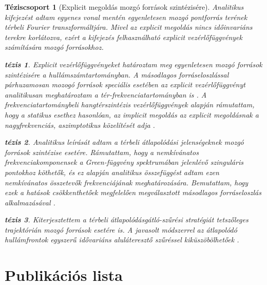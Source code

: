\documentclass[10pt,twoside]{article}
\theoremstyle{thesisgroupstyle}
\newtheorem{thesisgroup}{Téziscsoport}
\theoremstyle{indented}
\newtheorem{thesis}{tézis}[thesisgroup]
\begin{document}
\begin{thesisgroup}[Explicit megoldás mozgó források szintézisére]
Analitikus kifejezést adtam egyenes vonal mentén egyenletesen mozgó pontforrás terének térbeli Fourier transzformáltjára.
Mivel az explicit megoldás nincs időinvariáns terekre korlátozva, ezért a kifejezés felhasználható explicit vezérlőfüggvények számítására mozgó forrásokhoz.
\begin{thesis} 
Explicit vezérlőfüggvényeket határoztam meg egyenletesen mozgó források szintézisére a hullámszámtartományban.
A másodlagos forráseloszlással párhuzamosan mozogó források speciális esetében az explicit vezérlőfüggvényt analitikusan meghatároztam a tér-frekvenciatartományban is \cite{Firtha2014:daga_booklet, Firtha2014:isma_booklet, firtha2015sound_booklet}.
A frekvenciatartománybeli hangtérszintézis vezérlőfüggvények alapján rámutattam, hogy a statikus esethez hasonlóan, az implicit megoldás az explicit megoldásnak a nagyfrekvenciás, aszimptotikus közelítését adja \cite{firtha2015sound_booklet}. 
\end{thesis}
\begin{thesis}
Analitikus leírását adtam a térbeli átlapolódási jelenségeknek mozgó források szintézise esetére.
Rámutattam, hogy a nemkívánatos frekvenciakomponensek a Green-függvény spektrumában jelenlévő szinguláris pontokhoz köthetők, és ez alapján analitikus összefüggést adtam ezen nemkívánatos összetevők frekvenciájának meghatározására.
Bemutattam, hogy ezek a hatások csökkenthetőek megfelelően megválasztott másodlagos forráseloszlás alkalmazásával \cite{firtha2016:daga_booklet}.
\end{thesis}
\begin{thesis} 
Kiterjesztettem a térbeli átlapolódásgátló-szűrési stratégiát tetszőleges trajektórián mozgó források esetére is.
A javasolt módszerrel az átlapolódó hullámfrontok egyszerű idővariáns aluláteresztő szűréssel kiküszöbölhetőek \cite{Firtha2018_daga_moving_source_booklet}.
\end{thesis}
\end{thesisgroup} 
\clearpage

\section*{Publikációs lista}

\nocite{*}
\begin{refcontext}[labelprefix=J]
\printbibliography[title={Folyóiratcikkek}, keyword=J, heading=subbibliography] 
\end{refcontext}
\begin{refcontext}[labelprefix=C]
\printbibliography[title={Konferencia közlemények}, keyword=C, heading=subbibliography] 
\end{refcontext}
\begin{refcontext}[labelprefix=O]
\printbibliography[title={Egyéb publikációk}, keyword=O, heading=subbibliography] 
\end{refcontext}
\end{document}
